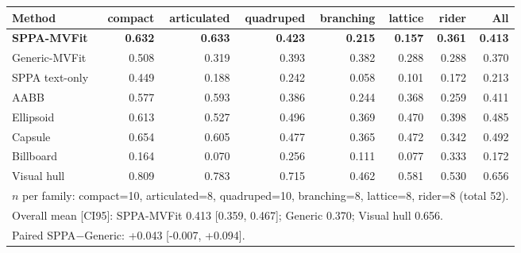 \begin{tabular}{lrrrrrrr}
\toprule
Method & compact & articulated & quadruped & branching & lattice & rider & All \\
\midrule
\textbf{SPPA-MVFit} & \textbf{0.632} & \textbf{0.633} & \textbf{0.423} & \textbf{0.215} & \textbf{0.157} & \textbf{0.361} & \textbf{0.413} \\
Generic-MVFit & 0.508 & 0.319 & 0.393 & 0.382 & 0.288 & 0.288 & 0.370 \\
SPPA text-only & 0.449 & 0.188 & 0.242 & 0.058 & 0.101 & 0.172 & 0.213 \\
AABB & 0.577 & 0.593 & 0.386 & 0.244 & 0.368 & 0.259 & 0.411 \\
Ellipsoid & 0.613 & 0.527 & 0.496 & 0.369 & 0.470 & 0.398 & 0.485 \\
Capsule & 0.654 & 0.605 & 0.477 & 0.365 & 0.472 & 0.342 & 0.492 \\
Billboard & 0.164 & 0.070 & 0.256 & 0.111 & 0.077 & 0.333 & 0.172 \\
Visual hull & 0.809 & 0.783 & 0.715 & 0.462 & 0.581 & 0.530 & 0.656 \\
\midrule
\multicolumn{8}{l}{\footnotesize $n$ per family: compact=10, articulated=8, quadruped=10, branching=8, lattice=8, rider=8 (total 52).}\\
\multicolumn{8}{l}{\footnotesize Overall mean [CI95]: SPPA-MVFit 0.413 [0.359, 0.467]; Generic 0.370; Visual hull 0.656.}\\
\multicolumn{8}{l}{\footnotesize Paired SPPA$-$Generic: +0.043 [-0.007, +0.094].}\\
\bottomrule
\end{tabular}
